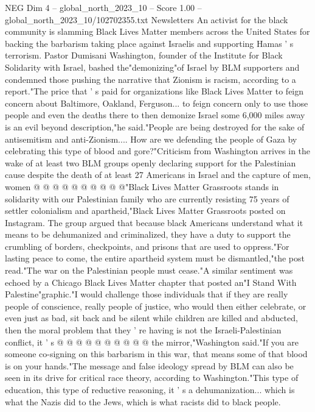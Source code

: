 \begin{textsample}{NEG Dim 4 – global\_north\_2023\_10 – Score 1.00 – global\_north\_2023\_10/102702355.txt}  \label{ex:f4_neg_019}
Newsletters An activist for the black community is slamming Black Lives Matter members across the United States for backing the barbarism taking place against Israelis and supporting Hamas ' s terrorism.
Pastor Dumisani Washington, founder of the Institute for Black Solidarity with Israel, bashed the"demonizing"of Israel by BLM supporters and condemned those pushing the narrative that Zionism is racism, according to a report."The price that ' s paid for organizations like Black Lives Matter to feign concern about Baltimore, Oakland, Ferguson... to feign concern only to use those people and even the deaths there to then demonize Israel some 6,000 miles away is an evil beyond description,"he said."People are being destroyed for the sake of antisemitism and anti-Zionism....
How are we defending the people of Gaza by celebrating this type of blood and gore?"Criticism from Washington arrives in the wake of at least two BLM groups openly declaring support for the Palestinian cause despite the death of at least 27 Americans in Israel and the capture of men, women @ @ @ @ @ @ @ @ @ @"Black Lives Matter Grassroots stands in solidarity with our Palestinian family who are currently resisting 75 years of settler colonialism and apartheid,"Black Lives Matter Grassroots posted on Instagram.
The group argued that because black Americans understand what it means to be dehumanized and criminalized, they have a duty to support the crumbling of borders, checkpoints, and prisons that are used to oppress."For lasting peace to come, the entire apartheid system must be dismantled,"the post read."The war on the Palestinian people must cease."A similar sentiment was echoed by a Chicago Black Lives Matter chapter that posted an"I Stand With Palestine"graphic."I would challenge those individuals that if they are really people of conscience, really people of justice, who would then either celebrate, or even just as bad, sit back and be silent while children are killed and abducted, then the moral problem that they ' re having is not the Israeli-Palestinian conflict, it ' s @ @ @ @ @ @ @ @ @ @ the mirror,"Washington said."If you are someone co-signing on this barbarism in this war, that means some of that blood is on your hands."The message and false ideology spread by BLM can also be seen in its drive for critical race theory, according to Washington."This type of education, this type of reductive reasoning, it ' s a dehumanization... which is what the Nazis did to the Jews, which is what racists did to black people.

\end{textsample}
